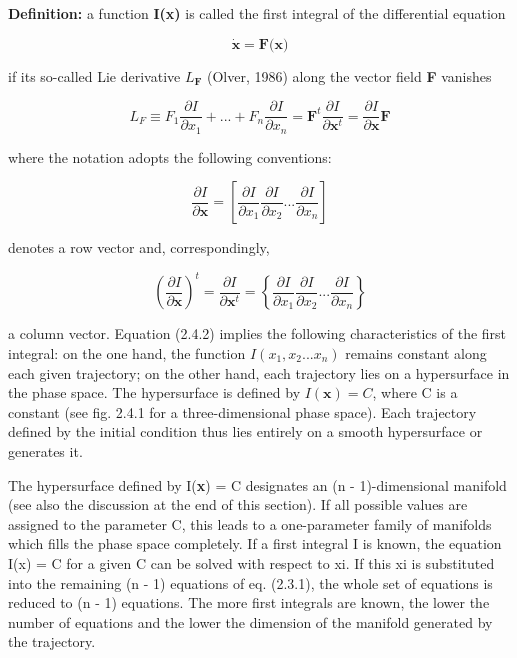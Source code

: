 \documentclass[12pt]{article}
\begin{document}
\hfill

\textbf{Definition:} a function \textbf{I(x)} is called the first integral of the differential equation

\[
\dot{\textbf{x}}  = \textbf{F(x)} 
\]

if its so-called Lie derivative $L_{\textbf{F}}$  (Olver, 1986) along the vector field \textbf{F} vanishes

\[
L_F \equiv F_1 \frac{\partial I}{\partial x_1} + ... + F_n \frac{\partial I}{\partial x_n} = \textbf{F}^t \frac{\partial 
I}{\partial \textbf{x}^t} = \frac{\partial I}{\partial \textbf{x}} \textbf{F}
\]

where the notation adopts the following conventions:

\[
\frac{\partial I}{\partial \textbf{x}} = \left [ \frac{\partial I}{\partial x_1} \frac{\partial I}{\partial x_2} 
...\frac{\partial I}{\partial x_n} \right ]
\]

denotes a row vector and, correspondingly,

\[
\left (  \frac{\partial I}{\partial \textbf{x}} \right )^t =  \frac{\partial I}{\partial \textbf{x}^t} =\left\{ \frac{\partial 
I}{\partial x_1} \frac{\partial I}{\partial x_2} ...\frac{\partial I}{\partial x_n} \right\}
\]

a column vector. Equation (2.4.2) implies the following characteristics of the first
integral: on the one hand, the function $I(x_1, x_2 . . . x_n)$ remains constant along each
given trajectory; on the other hand, each trajectory lies on a hypersurface in the
phase space. The hypersurface is defined by $I(\textbf{x}) = C$, where C is a constant (see
fig. 2.4.1 for a three-dimensional phase space). Each trajectory defined by the initial
condition thus lies entirely on a smooth hypersurface or generates it.

\hfill

The hypersurface defined by I(\textbf{x}) = C designates an (n - 1)-dimensional manifold (see also the discussion at the end 
of this section). If all possible values are assigned
to the parameter C, this leads to a one-parameter family of manifolds which fills
the phase space completely. If a first integral I is known, the equation I(x) = C
for a given C can be solved with respect to xi. If this xi is substituted into the
remaining (n - 1) equations of eq. (2.3.1), the whole set of equations is reduced
to (n - 1) equations. The more first integrals are known, the lower the number of
equations and the lower the dimension of the manifold generated by the trajectory.
\end{document}
